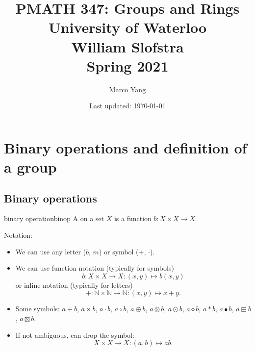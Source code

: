 \documentclass[12pt,letterpaper]{report}
\begin{document}

\title{
  \Huge
  \textbf{PMATH 347: Groups and Rings} \\[\baselineskip]
  \large
  University of Waterloo \\
  William Slofstra \\
  Spring 2021
}
\author{Marco Yang}
\date{Last updated: \today}

{
  \sffamily
  \maketitle
}
\thispagestyle{empty}

\pagebreak
{}
\setcounter{page}{2}

{
  \sffamily
  \tableofcontents{\markboth{\contentsname}{}}
}

\pagebreak
{}


\section{Binary operations and definition of a group}

\subsection{Binary operations}

\begin{defn}{binary operation}{binop}
  A  on a set $X$ is a function $b \colon X \times X \to X$.
\end{defn}

Notation:
\begin{itemize}
  \item
  We can use any letter ($b$, $m$) or symbol ($+$, $\cdot$).
  \item
  We can use function notation (typically for symbols)
  \[ b \colon X \times X \to X : (x, y) \mapsto b(x, y) \]
  or inline notation (typically for letters)
  \[ + \colon \mathbb{N} \times \mathbb{N} \to \mathbb{N} : (x, y) \mapsto x + y. \]
  \item
  Some symbols: $a + b$, $a \times b$, $a \cdot b$, $a \circ b$, $a \oplus b$, $a \otimes b$,
  $a \odot b$, $a \diamond b$, $a * b$, $a \bullet b$, $a \boxplus b$, $a \boxtimes b$.
  \item
  If not ambiguous, can drop the symbol:
  \[ X \times X \to X : (a, b) \mapsto ab. \]
\end{itemize}
\end{document}

